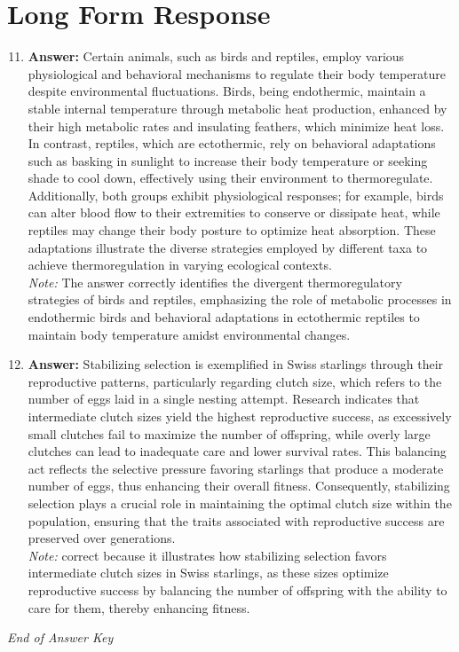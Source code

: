 \documentclass[12pt]{article}
\begin{document}
\section*{Long Form Response}
\begin{enumerate}[label=\arabic*.]
\setcounter{enumi}{10}
\item \textbf{Answer:} Certain animals, such as birds and reptiles, employ various physiological and behavioral mechanisms to regulate their body temperature despite environmental fluctuations. Birds, being endothermic, maintain a stable internal temperature through metabolic heat production, enhanced by their high metabolic rates and insulating feathers, which minimize heat loss. In contrast, reptiles, which are ectothermic, rely on behavioral adaptations such as basking in sunlight to increase their body temperature or seeking shade to cool down, effectively using their environment to thermoregulate. Additionally, both groups exhibit physiological responses; for example, birds can alter blood flow to their extremities to conserve or dissipate heat, while reptiles may change their body posture to optimize heat absorption. These adaptations illustrate the diverse strategies employed by different taxa to achieve thermoregulation in varying ecological contexts.
\\ \textit{Note:} The answer correctly identifies the divergent thermoregulatory strategies of birds and reptiles, emphasizing the role of metabolic processes in endothermic birds and behavioral adaptations in ectothermic reptiles to maintain body temperature amidst environmental changes.
\item \textbf{Answer:} Stabilizing selection is exemplified in Swiss starlings through their reproductive patterns, particularly regarding clutch size, which refers to the number of eggs laid in a single nesting attempt. Research indicates that intermediate clutch sizes yield the highest reproductive success, as excessively small clutches fail to maximize the number of offspring, while overly large clutches can lead to inadequate care and lower survival rates. This balancing act reflects the selective pressure favoring starlings that produce a moderate number of eggs, thus enhancing their overall fitness. Consequently, stabilizing selection plays a crucial role in maintaining the optimal clutch size within the population, ensuring that the traits associated with reproductive success are preserved over generations.
\\ \textit{Note:} correct because it illustrates how stabilizing selection favors intermediate clutch sizes in Swiss starlings, as these sizes optimize reproductive success by balancing the number of offspring with the ability to care for them, thereby enhancing fitness.
\end{enumerate}

\vfill
\noindent\textit{End of Answer Key}
\end{document}

